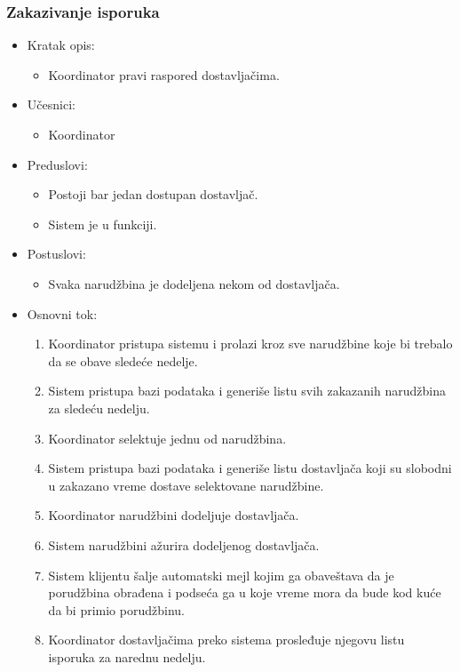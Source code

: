 
\subsubsection{Zakazivanje isporuka}

\begin{itemize}
	\item Kratak opis:
		\begin{itemize}
			\item Koordinator pravi raspored dostavljačima.
		\end{itemize}
	\item Učesnici:
		\begin{itemize}
		    \item Koordinator
		\end{itemize}
	\item Preduslovi:
		\begin{itemize}
		    \item Postoji bar jedan dostupan dostavljač.
		    \item Sistem je u funkciji.
		\end{itemize}
	\item Postuslovi:
		\begin{itemize}
			\item Svaka narudžbina je dodeljena nekom od dostavljača.
	\end{itemize}
	\item Osnovni tok:
		\begin{enumerate}
            \item Koordinator pristupa sistemu i prolazi kroz sve narudžbine koje bi trebalo da se obave sledeće nedelje.
            \item Sistem pristupa bazi podataka i generiše listu svih zakazanih narudžbina za sledeću nedelju.
            \item Koordinator selektuje jednu od narudžbina.
            \item Sistem pristupa bazi podataka i generiše listu dostavljača koji su slobodni u zakazano vreme dostave selektovane narudžbine.
           \item Koordinator narudžbini dodeljuje dostavljača.
           \item Sistem narudžbini ažurira dodeljenog dostavljača.
            \item Sistem klijentu šalje automatski mejl kojim ga obaveštava da je porudžbina obrađena i podseća  ga u koje vreme mora da bude kod kuće da bi primio porudžbinu.
            \item Koordinator dostavljačima preko sistema prosleđuje njegovu listu isporuka za narednu nedelju.

\end{enumerate}
\end{itemize}
